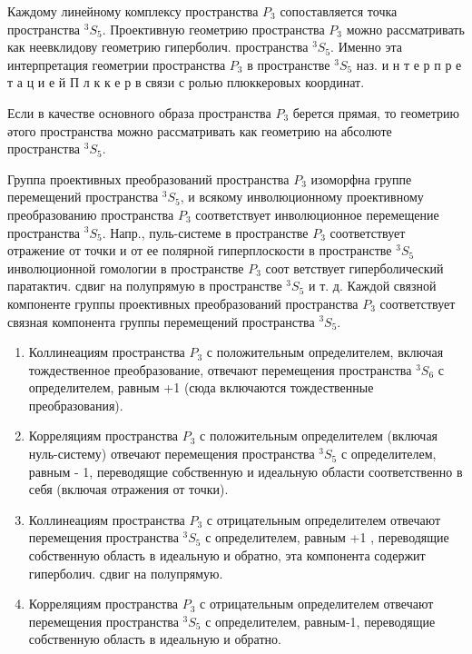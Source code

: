 \documentclass[10pt]{article}
\begin{document}
Каждому линейному комплексу пространства $P_{3}$ сопоставляется точка пространства ${ }^{3} S_{5}$. Проективную геометрию пространства $P_{3}$ можно рассматривать как неевклидову геометрию гиперболич. пространства ${ }^{3} S_{5}$. Именно эта интерпретация геометрии пространства $P_{3}$ в пространстве ${ }^{3} S_{5}$ наз. и н т е р п р е т а ц и е й П л к к е р в связи с ролью плюккеровых координат.



Если в качестве основного образа пространства $P_{3}$ берется прямая, то геометрию әтого пространства можно рассматривать как геометрию на абсолюте пространства ${ }^{3} S_{5}$.



Группа проективных преобразований пространства $P_{3}$ изоморфна группе перемещений пространства ${ }^{3} S_{5}$, и всякому инволюционному проективному преобразованию пространства $P_{3}$ соответствует инволюционное перемещение пространства ${ }^{3} S_{5}$. Напр., пуль-системе в пространстве $P_{3}$ соответствует отражение от точки и от ее полярной гиперплоскости в пространстве ${ }^{3} S_{5}$ инволюционной гомологии в пространстве $P_{3}$ соот ветствует гиперболический паратактич. сдвиг на полупрямую в пространстве ${ }^{3} S_{5}$ и т. д. Каждой связной компоненте группы проективных преобразований пространства $P_{3}$ соответствует связная компонента группы перемещений пространства ${ }^{3} S_{5}$.



\begin{enumerate}

  \item Коллинеациям пространства $P_{3}$ с положительным определителем, включая тождественное преобразование, отвечают перемещения пространства ${ }^{3} S_{6}$ с определителем, равным +1 (сюда включаются тождественные преобразования).



  \item Корреляциям пространства $P_{3}$ с положительным определителем (включая нуль-систему) отвечают перемещения пространства ${ }^{3} S_{5}$ с определителем, равным - 1, переводящие собственную и идеальную области соответственно в себя (включая отражения от точки).



  \item Коллинеациям пространства $P_{3}$ с отрицательным определителем отвечают перемещения пространства ${ }^{3} S_{5}$ с определителем, равным +1 , переводящие собственную область в идеальную и обратно, эта компонента содержит гиперболич. сдвиг на полупрямую.



  \item Корреляциям пространства $P_{3}$ с отрицательным определителем отвечают перемещения пространства ${ }^{3} S_{5}$ с определителем, равным-1, переводящие собственную область в идеальную и обратно.



\end{enumerate}
\end{document}
